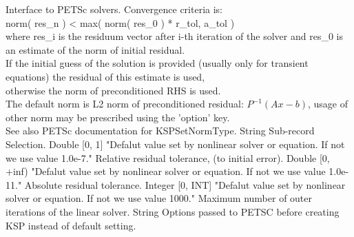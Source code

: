 \begin{RecordType}
	{}
	{} %
	{} %
	{} %
	{{{Interface to PETSc solvers. Convergence criteria is:}\\
\ttfamily norm( res{\_}n )  {\textless} max( norm( res{\_}0 ) * r{\_}tol, a{\_}tol )\\{
where res{\_}i is the residuum vector after i-th iteration of the solver and res{\_}0 is an estimate of the norm of initial residual.}\\{
If the initial guess of the solution is provided (usually only for transient equations) the residual of this estimate is used,}\\{
otherwise the norm of preconditioned RHS is used.}\\{
The default norm is L2 norm of preconditioned residual: }{$ P^{-1}(Ax-b)$}{, usage of other norm may be prescribed using the 'option' key.}\\{
See also PETSc documentation for KSPSetNormType.}}}
		\KeyItem
			{}
			{{String}}
			{\textrangle}
			{} %
			{{{Sub-record Selection.}}}
		\KeyItem
			{}
			{{Double [0, 1]}}
			{"{Defalut value set by nonlinear solver or equation. If not we use value 1.0e-7.}"}
			{} %
			{{{Relative residual tolerance,  (to initial error).}}}
		\KeyItem
			{}
			{{Double [0, +inf)}}
			{"{Defalut value set by nonlinear solver or equation. If not we use value 1.0e-11.}"}
			{} %
			{{{Absolute residual tolerance.}}}
		\KeyItem
			{}
			{{Integer [0, INT]}}
			{"{Defalut value set by nonlinear solver or equation. If not we use value 1000.}"}
			{} %
			{{{Maximum number of outer iterations of the linear solver.}}}
		\KeyItem
			{}
			{{String}}
			{\textlangle{ \it{} }\textrangle}
			{} %
			{{{Options passed to PETSC before creating KSP instead of default setting.}}}
\end{RecordType}
